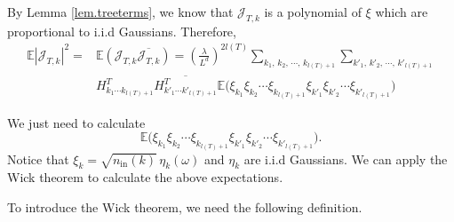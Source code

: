 

By Lemma \ref{lem.treeterms}, we know that $\mathcal{J}_{T,k}$ is a polynomial of $\xi$ which are proportional to i.i.d Gaussians. Therefore, 
\begin{equation}\label{eq.termexp1}
\begin{split}
    \mathbb{E}|\mathcal{J}_{T,k}|^2=&\mathbb{E}(\mathcal{J}_{T,k}\overline{\mathcal{J}_{T,k}})=\left(\frac{\lambda}{L^{d}}\right)^{2l(T)}
    \sum_{k_1,\, k_2,\, \cdots,\, k_{l(T)+1}}\sum_{k'_1,\, k'_2,\, \cdots,\, k'_{l(T)+1}}
    \\[0.5em]
    & H^T_{k_1\cdots k_{l(T)+1}} \overline{H^{T}_{k'_1\cdots k'_{l(T)+1}}}  \mathbb{E}\Big(\xi_{k_1}\xi_{k_2}\cdots\xi_{k_{l(T)+1}}\xi_{k'_1}\xi_{k'_2}\cdots\xi_{k'_{l(T)+1}}\Big)
\end{split}
\end{equation}

We just need to calculate 
\begin{equation}\label{eq.expectation''}
    \mathbb{E}\Big(\xi_{k_1}\xi_{k_2}\cdots\xi_{k_{l(T)+1}}
    \xi_{k'_1}\xi_{k'_2}\cdots\xi_{k'_{l(T)+1}}\Big).
\end{equation}
Notice that $\xi_k=\sqrt{n_{\textrm{in}}(k)} \, \eta_{k}(\omega)$ and $\eta_{k}$ are i.i.d Gaussians. We can apply the Wick theorem to calculate the above expectations. 

To introduce the Wick theorem, we need the following definition.

